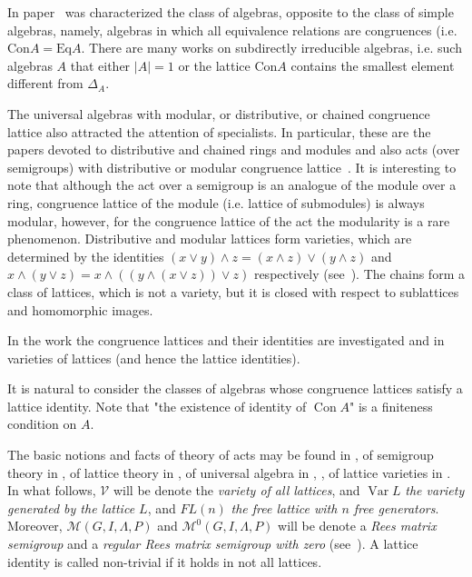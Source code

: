 \documentclass{birkau}
\numberwithin{equation}{section}
\theoremstyle{plain}
\theoremstyle{definition}
\DeclareMathOperator{\Con}{Con}
\DeclareMathOperator{\Var}{Var}
\begin{document}
	In paper~\cite{resh} was characterized the class of algebras, opposite to the class of simple algebras, namely, algebras in which all equivalence relations are congruences (i.e. $ \text{Con}A = \text{Eq}A $.
    There are many works on subdirectly irreducible algebras, i.e. such algebras $A$ that either $ |A| = 1 $ or the lattice Con$A$ contains the smallest element different from $ \Delta_A $.
	
	The universal algebras with modular, or distributive, or chained congruence lattice also attracted the attention of specialists. In particular, these are the papers devoted to distributive and chained rings and modules and also acts (over semigroups) with distributive or modular congruence lattice~\cite{step,hal3}. It is interesting to note that although the act over a semigroup is an analogue of the module over a ring, congruence lattice of the module (i.e. lattice of submodules) is always modular, however, for the congruence lattice of the act the modularity is a rare phenomenon. Distributive and modular lattices form varieties, which are determined by the identities $ (x \vee y) \wedge z = (x \wedge z ) \vee (y \wedge z) $ and $ x \wedge ( y \vee z ) = x \wedge (( y \wedge (x \vee z)) \vee z ) $ respectively (see~\cite[Chapter 4, Theorem 1.1]{gretz}).  The chains form a class of lattices, which is not a variety, but it is closed with respect to sublattices and homomorphic images.
	
In the work \cite{memoirs} the congruence lattices and their identities are investigated and in \cite{jipsen} varieties of lattices (and hence the lattice identities).

It is natural to consider the classes of algebras whose congruence lattices satisfy a lattice identity.	
Note that "the existence of identity of $\Con A$" is a finiteness condition on $A$.

The basic notions and facts of theory of acts may be found in \cite{kilp}, of semigroup theory in \cite{cliff}, of lattice theory in  \cite{gretz}, of universal algebra in \cite{burris}, \cite{kon}, of lattice varieties in \cite{jipsen}. 	
In what follows, $\mathcal{V}$ will be denote the \textit{variety of all lattices}, and $\Var L$ \textit{the variety generated by the lattice $L$}, and $FL(n)$ \textit{the free lattice with $n$ free generators}. Moreover, $\mathcal{M}(G,I,\Lambda,P)$ and $\mathcal{M}^0(G,I,\Lambda,P)$ will be denote a \textit{Rees matrix semigroup} and a \textit{regular Rees matrix semigroup with zero} (see~\cite[Chap.2]{cliff}). A lattice identity is called non-trivial if it holds in not all lattices.
	
\end{document}
